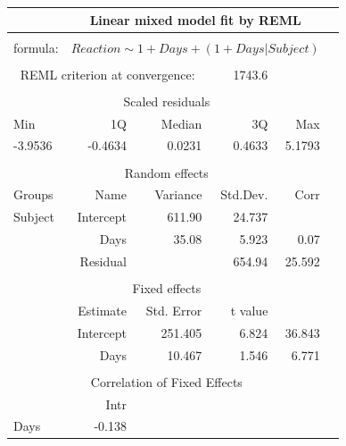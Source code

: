 \documentclass[
]{article}
\begin{document}
\begin{longtable}[]{@{}lrrrrr@{}}
                                                 \toprule
 & \multicolumn{4}{c}{Linear mixed model fit by REML} \tabularnewline
                                                 \midrule
                                                 \tabularnewline
formula: & \multicolumn{4}{c}{$Reaction \sim 1 + Days + (1 + Days | Subject)$} \tabularnewline
                                                 \tabularnewline
\multicolumn{3}{c}{REML criterion at convergence:} & 1743.6                                                                                                                                                    \tabularnewline
                                                 \tabularnewline
\multicolumn{5}{c}{Scaled residuals}             \tabularnewline
                                                 \midrule
Min & 1Q & Median & 3Q & Max                     \tabularnewline
                                                 \midrule
-3.9536 & -0.4634 & 0.0231 & 0.4633 & 5.1793     \tabularnewline
                                                 \midrule
                                                 \tabularnewline
\multicolumn{5}{c}{Random effects}               \tabularnewline
                                                 \midrule
Groups & Name & Variance & Std.Dev. & Corr       \tabularnewline
\midrule
Subject & Intercept & 611.90 & 24.737 &          \tabularnewline
        & Days      & 35.08  & 5.923  & 0.07     \tabularnewline
        & Residual  &        & 654.94 & 25.592   \tabularnewline
                                                 \midrule
                                                 \tabularnewline
\multicolumn{5}{c}{Fixed effects}                \tabularnewline
                                                 \midrule
        & Estimate  & Std. Error & t value &     \tabularnewline
                                                 \midrule
   & Intercept & 251.405 & 6.824 &  36.843       \tabularnewline
   & Days      & 10.467  & 1.546 &  6.771        \tabularnewline
                                                 \midrule
                                                 \tabularnewline
\multicolumn{5}{c}{Correlation of Fixed Effects} \tabularnewline
                                                 \midrule
& Intr                                           \tabularnewline
                                                 \midrule
Days & -0.138                                    \tabularnewline
                                                 \bottomrule
\end{longtable} 
\end{document}
